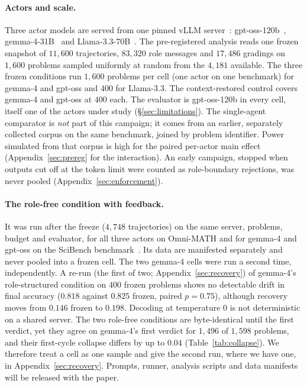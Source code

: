\paragraph{Actors and scale.} Three actor models are served from one pinned
vLLM server~\cite{kwon2023vllm}: gpt-oss-120b~\cite{openai2025gptoss},
gemma-4-31B~\cite{gemma2026gemma4} and
Llama-3.3-70B~\cite{grattafiori2024llama3}. The pre-registered analysis reads one
frozen snapshot of $11{,}600$ trajectories, $83{,}320$ role messages and
$17{,}486$ gradings on $1{,}600$ problems
sampled uniformly at random from the $4{,}181$ available. The three frozen
conditions run $1{,}600$ problems per cell (one actor on one benchmark) for gemma-4 and gpt-oss and $400$ for Llama-3.3. The
context-restored control covers gemma-4 and gpt-oss at $400$ each. The
evaluator is gpt-oss-120b in every cell, itself one of the actors under
study (\S\ref{sec:limitations}). The single-agent comparator is \emph{not}
part of this campaign; it comes from an earlier, separately collected corpus
on the same benchmark, joined by problem identifier. Power simulated from
that corpus is high for the paired per-actor main effect
(Appendix~\ref{sec:prereg} for the interaction). An early campaign, stopped when
outputs cut off at the token limit were counted as role-boundary rejections,
was never pooled (Appendix~\ref{sec:enforcement}).

\paragraph{The role-free condition with feedback.} It was run after the freeze
($4{,}748$ trajectories) on the same server, problems, budget and evaluator,
for all three actors on Omni-MATH and for gemma-4 and gpt-oss on the
SciBench benchmark~\cite{wang2024scibench}. Its data are manifested
separately and never pooled into a frozen cell. The two gemma-4 cells were
run a second time, independently. A re-run (the first of two; Appendix~\ref{sec:recovery}) of gemma-4's role-structured
condition on $400$ frozen problems shows no detectable drift in final
accuracy ($0.818$ against $0.825$ frozen, paired $p=0.75$), although
recovery moves from $0.146$ frozen to $0.198$. Decoding at temperature $0$ is not deterministic on a
shared server. The two role-free conditions are byte-identical until the
first verdict, yet they agree on gemma-4's first verdict for $1{,}496$ of
$1{,}598$ problems, and their first-cycle collapse differs by up to $0.04$
(Table~\ref{tab:collapse}). We therefore treat a cell as one sample and give
the second run, where we have one, in Appendix~\ref{sec:recovery}. Prompts, runner,
analysis scripts and data manifests will be released with the paper.


